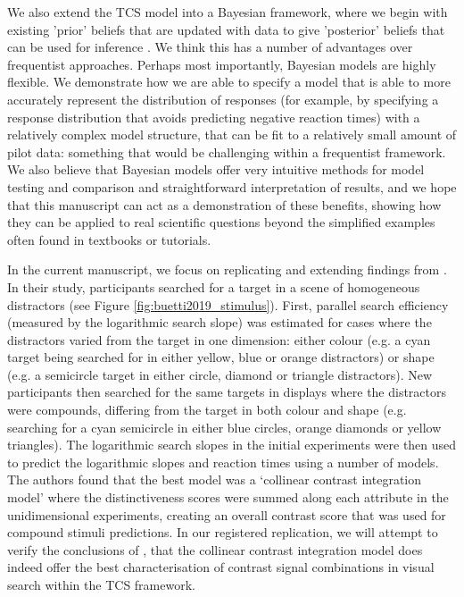 \documentclass[preprint,12pt,authoryear]{elsarticle}
\begin{document}
We also extend the TCS model into a Bayesian framework, where we begin with existing 'prior' beliefs that are updated with data to give 'posterior' beliefs that can be used for inference \citep{mcelreath2020statistical}. We think this has a number of advantages over frequentist approaches. Perhaps most importantly, Bayesian models are highly flexible. We demonstrate how we are able to specify a model that is able to more accurately represent the distribution of responses (for example, by specifying a response distribution that avoids predicting negative reaction times) with a relatively complex model structure, that can be fit to a relatively small amount of pilot data: something that would be challenging within a frequentist framework. We also believe that Bayesian models offer very intuitive methods for model testing and comparison and straightforward interpretation of results, and we hope that this manuscript can act as a demonstration of these benefits, showing how they can be applied to real scientific questions beyond the simplified examples often found in textbooks or tutorials.

In the current manuscript, we focus on replicating and extending findings from \cite{buetti2019predicting}. In their study, participants searched for a target in a scene of homogeneous distractors (see Figure \ref{fig:buetti2019_stimulus}). First, parallel search efficiency (measured by the logarithmic search slope) was estimated for cases where the distractors varied from the target in one dimension: either colour (e.g. a cyan target being searched for in either yellow, blue or orange distractors) or shape (e.g. a semicircle target in either circle, diamond or triangle distractors). New participants then searched for the same targets in displays where the distractors were compounds, differing from the target in both colour and shape (e.g. searching for a cyan semicircle in either blue circles, orange diamonds or yellow triangles). The logarithmic search slopes in the initial experiments were then used to predict the logarithmic slopes and reaction times using a number of models. The authors found that the best model was a `collinear contrast integration model' where the distinctiveness scores were summed along each attribute in the unidimensional experiments, creating an overall contrast score that was used for compound stimuli predictions. In our registered replication, we will attempt to verify the conclusions of \cite{buetti2019predicting}, that the collinear contrast integration model does indeed offer the best characterisation of contrast signal combinations in visual search within the TCS framework.
\end{document}
